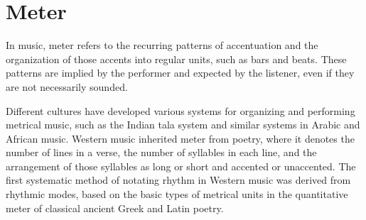 \section{Meter}

In music, meter refers to the recurring patterns of accentuation and the organization of those accents into regular units, such as bars and beats. These patterns are implied by the performer and expected by the listener, even if they are not necessarily sounded.

Different cultures have developed various systems for organizing and performing metrical music, such as the Indian tala system and similar systems in Arabic and African music. Western music inherited meter from poetry, where it denotes the number of lines in a verse, the number of syllables in each line, and the arrangement of those syllables as long or short and accented or unaccented. The first systematic method of notating rhythm in Western music was derived from rhythmic modes, based on the basic types of metrical units in the quantitative meter of classical ancient Greek and Latin poetry.